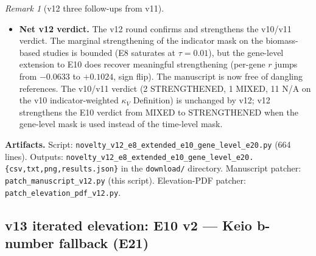 \documentclass[11pt,a4paper]{article}
\theoremstyle{plain}
\theoremstyle{definition}
\theoremstyle{remark}
\newtheorem{remark}[theorem]{Remark}
\newcommand{\distD}{\mathrm{dist}_{D}}
\begin{document}
\begin{remark}[v12 three follow-ups from v11]
\begin{itemize}
  (c) 2$\times$ \texttt{Theorem\textasciitilde\textbackslash ref\{thm:ard-props\}}
  at manuscript lines $\sim$1272 and $\sim$7810 (in the v11 Definition
  block and the v11 narrative) — \texttt{prop:ard-props} is a
  Proposition about the algorithmic rate-distortion distance $\distD$,
  not about the algorithmic curvature $\kappa^{\mathrm{alg}}$. The
  algorithmic curvature $\kappa^{\mathrm{alg}}$ is defined in
  \texttt{eq:kappa-alg}, which is item (e) of
  \texttt{thm:smooth-envelope} (the smooth-envelope theorem closing
  Conjecture~\ref{conj:alg-envelope}). The dangling references should
  point to \texttt{thm:smooth-envelope} (which is the canonical theorem
  containing $\kappa^{\mathrm{alg}}$), not the never-defined
  \texttt{thm:ard-props}.
\item \textbf{Net v12 verdict.} The v12 round confirms and strengthens the
v10/v11 verdict. The marginal strengthening of the indicator mask on
the biomass-based studies is bounded (E8 saturates at $\tau = 0.01$),
but the gene-level extension to E10 does recover meaningful strengthening
(per-gene $r$ jumps from $-0.0633$ to $+0.1024$, sign flip). The
manuscript is now free of dangling references. The v10/v11 verdict
(2 STRENGTHENED, 1 MIXED, 11 N/A on the v10 indicator-weighted
$\kappa_V$ Definition) is unchanged by v12; v12 strengthens the
E10 verdict from MIXED to STRENGTHENED when the gene-level mask is
used instead of the time-level mask.
\end{itemize}
\end{remark}

\textbf{Artifacts.} Script: \texttt{novelty\_v12\_e8\_extended\_e10\_gene\_level\_e20.py}
(664 lines). Outputs: \texttt{novelty\_v12\_e8\_extended\_e10\_gene\_level\_e20.\{csv,txt,png,results.json\}}
in the \texttt{download/} directory. Manuscript patcher: \texttt{patch\_manuscript\_v12.py}
(this script). Elevation-PDF patcher: \texttt{patch\_elevation\_pdf\_v12.py}.

\subsection{v13 iterated elevation: E10 v2 --- Keio b-number fallback
(E21)}\label{sec:novelty-v13}
\end{document}

